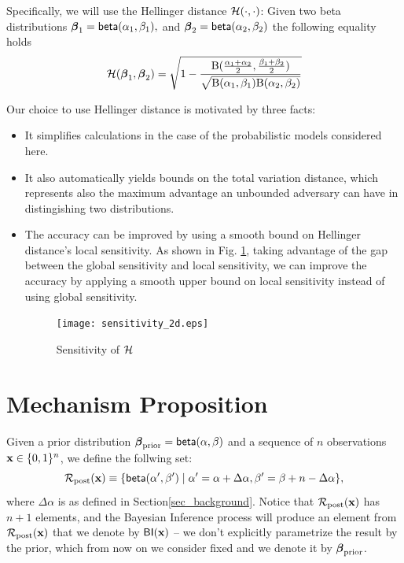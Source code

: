 \documentclass{article}
\begin{document}
Specifically, we will use the Hellinger distance $\mathcal{H}(\cdot,\cdot)$:
Given two beta distributions
$\boldsymbol{\beta}_1=\mathsf{beta}(\alpha_1, \beta_1),$ and $\boldsymbol{\beta}_2=\mathsf{beta}(\alpha_2, \beta_2)$ the following equality holds 
\[
  \mathcal{H}(\boldsymbol{\beta}_1, \boldsymbol{\beta}_2)=
  \sqrt{1 - \frac{\textup{B}(\frac{\alpha_1 + \alpha_2}{2}, \frac{\beta_1 + \beta_2}{2})}{\sqrt{\textup{B}(\alpha_1,\beta_1)\textup{B}(\alpha_2,\beta_2)}}}
\]

Our choice to use Hellinger distance is motivated by three facts:
\begin{itemize}
\item It simplifies calculations in the case of the probabilistic models considered here.
\item It also automatically yields bounds on the total variation distance, which represents also the maximum advantage
an unbounded adversary can have in distingishing two distributions. 
\item The accuracy can be improved by using a smooth bound on Hellinger distance's local sensitivity. As shown in Fig. \ref{fig_sensitivity}, taking advantage of the gap between the global sensitivity and local sensitivity, we can improve the accuracy by applying a smooth upper bound on local sensitivity instead of using global sensitivity.
\begin{figure}[ht]
\centering
\texttt{[image: sensitivity\_2d.eps]}
\caption{{Sensitivity of $\mathcal{H}$}}
\label{fig_sensitivity}
\end{figure}
\end{itemize}



\section{Mechanism Proposition}
\label{sec_mechs}
Given a prior distribution $\boldsymbol{\beta}_{\textup{prior}}=\mathsf{beta}(\alpha, \beta)$ and a sequence of $n$ observations $\textbf{x}\in\{0,1\}^n$, we define the follwing set:
\[
  \mathcal{R}_{\textup{post}}(\textbf{x})\equiv\{\mathsf{beta}(\alpha',\beta')\mid \alpha'=\alpha+\Delta\alpha, \beta'=\beta+n-\Delta\alpha\},
\]
where $\Delta\alpha$ is as defined in Section\ref{sec_background}.
Notice that $\mathcal{R}_{\textup{post}}(\textbf{x})$ has $n + 1$ elements, and
the Bayesian Inference process will produce an element from $\mathcal{R}_{\textup{post}}(\textbf{x})$
that we denote by $\mathsf{BI}(\textbf{x})$ -- we don't explicitly
parametrize the result by the prior, which from now on we consider
fixed and we denote it by $\boldsymbol{\beta}_{\textup{prior}}$.
\end{document}

